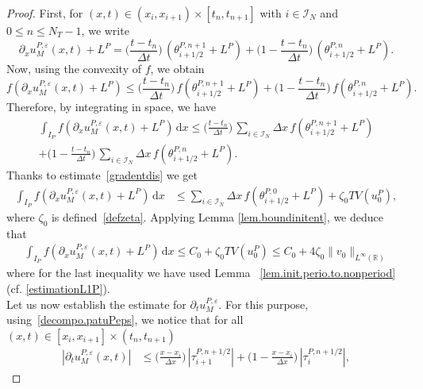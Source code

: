 \documentclass[11pt]{amsart}
\newcommand{\dd}{\mathrm{d}}
\newcommand{\pa}{\partial}
\newcommand{\R}{\mathbb{R}}
\newcommand{\I}{\mathcal{I}_N}
\newcommand{\eps}{\varepsilon}
\begin{document}
\begin{proof}
First, for $(x,t)\in(x_i,x_{i+1})\times[t_n,t_{n+1}]$ with $i\in \I$ and $0\le n \le N_T-1$, we write
\begin{equation}\label{uepsilonx + L}
\partial_x u^{P, \eps}_M(x,t)  + L^P=  \bigg(\frac{t - t_n}{\Delta t}\bigg) \, \left(\theta_{i +1/2}^{P, n + 1} + L^P\right) + \bigg(1 - \frac{t - t_n}{\Delta t}\bigg) \, \left(\theta_{i +1/2}^{P, n }+ L^P\right). 
\end{equation}
Now, using the convexity of $f$, we obtain
\[
f\left(\partial_x u^{P, \eps}_M(x,t)+L^P \right) \leq \bigg(\frac{t - t_n}{\Delta t}\bigg) \, f\left(\theta_{i +1/2} ^{P, n + 1} + L^P\right)+ \bigg(1 - \frac{t - t_n}{\Delta t}\bigg) \, f\left(\theta_{i +1/2}^{P, n }+ L^P\right).
\]
Therefore, by integrating in space, we have
\begin{multline*}
\int_{I_P} f\left(\partial_x u^{P, \eps}_M(x,t)+L^P \right)\, \dd x \leq \bigg(\frac{t - t_n}{\Delta t}\bigg) \, \sum_{i\in\I} \Delta x\, f\left(\theta^{P,n+1}_{i+1/2}+L^P\right)\\
+ \bigg(1 - \frac{t - t_n}{\Delta t}\bigg) \, \sum_{i\in\I} \Delta x \, f\left(\theta^{P,n}_{i+1/2}+L^P\right).
\end{multline*}
Thanks to estimate~\eqref{gradentdis} we get
\begin{align*}
\int_{I_P} f\left(\partial_x u^{P, \eps}_M(x,t)+L^P \right)\, \dd x &\leq \sum_{i\in\I} \Delta x \, f\left(\theta^{P,0}_{i+1/2}+L^P\right) + \zeta_0 TV(u^P_0), 
\end{align*}
where $\zeta_0$ is defined~\eqref{defzeta}. Applying Lemma \ref{lem.boundinitent}, we deduce that 
\begin{align*}
   \int_{I_P} f\left(\partial_x u^{P, \eps}_M(x,t)+L^P \right)\, \dd x 
   \leq C_0 + \zeta_0  TV(u^P_0)
   \le C_0 + 4\zeta_0  \|v_0\|_{L^\infty(\R)}
\end{align*}
where for the last inequality we have used Lemma~ \ref{lem.init.perio.to.nonperiod} (cf. \eqref{estimationL1P}).\\
 Let us now establish the estimate for $\pa_t u^{P,\eps}_M$. For this purpose, using~\eqref{decompo.patuPeps}, we notice that for all $(x,t) \in [x_i,x_{i+1}]\times(t_n,t_{n+1})$
\begin{align*}
      \left|\partial_t u^{P, \eps}_M(x,t)\right| &\leq \bigg(\frac{x - x_i}{\Delta x}\bigg) \,\left|\tau_{i + 1}^{P, n + 1/2}\right| + \bigg( 1 - \frac{x - x_i}{\Delta x}\bigg) \, \left|\tau_{i } ^{P, n +1/2}\right|,
\end{align*}

\end{proof}
\end{document}
